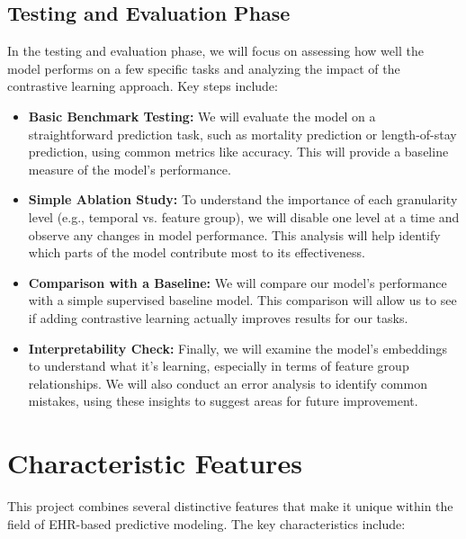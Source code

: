 \documentclass[a4paper]{article}
\begin{document}
\subsection{Testing and Evaluation Phase}
In the testing and evaluation phase, we will focus on assessing how well the model performs on a few specific tasks and analyzing the impact of the contrastive learning approach. Key steps include:
    \begin{itemize}
        \item \textbf{Basic Benchmark Testing:} We will evaluate the model on a straightforward prediction task, such as mortality prediction or length-of-stay prediction, using common metrics like accuracy. This will provide a baseline measure of the model’s performance.
        
        \item \textbf{Simple Ablation Study:} To understand the importance of each granularity level (e.g., temporal vs. feature group), we will disable one level at a time and observe any changes in model performance. This analysis will help identify which parts of the model contribute most to its effectiveness.
        
        \item \textbf{Comparison with a Baseline:} We will compare our model’s performance with a simple supervised baseline model. This comparison will allow us to see if adding contrastive learning actually improves results for our tasks.
        
        \item \textbf{Interpretability Check:} Finally, we will examine the model’s embeddings to understand what it’s learning, especially in terms of feature group relationships. We will also conduct an error analysis to identify common mistakes, using these insights to suggest areas for future improvement.
    \end{itemize}

    \section{Characteristic Features}

    This project combines several distinctive features that make it unique within the field of EHR-based predictive modeling. The key characteristics include:
    
\end{document}
